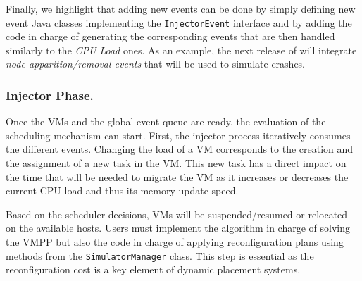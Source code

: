 
Finally, we highlight that adding new events can be done by simply
defining new event Java classes implementing the
\texttt{InjectorEvent} interface and by adding the code in charge of
generating the corresponding events that are then handled
similarly to the \emph{CPU Load}
ones.%
As an example, the next release of \vmps will integrate \emph{node
  apparition/removal events} that will be used to simulate crashes.

\vspace*{-.25cm}
\subsubsection{Injector Phase.}

Once the VMs and the global event queue are ready, the evaluation of
the scheduling mechanism can start. First, the injector process
iteratively consumes the different events.  Changing the load of a VM
corresponds to the creation and the assignment of a new \sg task in
the VM. This new task has a direct impact on the time that will be
needed to migrate the VM as it increases or decreases the current CPU
load and thus %
its memory update speed.
%

Based on the scheduler decisions, VMs will be suspended/resumed
or relocated on the available hosts.
Users must implement the algorithm in charge of solving the VMPP but
also the code in charge of applying reconfiguration plans using
methods from the \texttt{SimulatorManager} class. This step is
essential as the reconfiguration cost is a key element of dynamic
placement systems.

